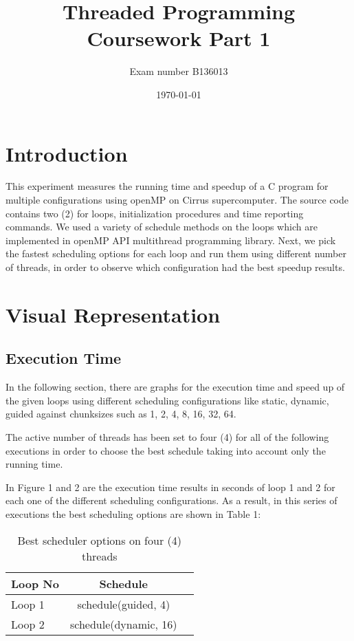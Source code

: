 \documentclass[12pt,a4paper]{article}
\newcommand{\sectionVspacing}{\vspace{15pt}}
\begin{document}
\title{Threaded Programming Coursework Part 1}
\author{Exam number B136013}
\date{\today}

\makeEPCCtitle

\thispagestyle{empty}

\newpage

\tableofcontents

\newpage



\section{Introduction}
This experiment measures the running time and speedup of a C program for multiple configurations using openMP on Cirrus supercomputer. The source code contains two (2) for loops, initialization procedures and time reporting commands. We used a variety of schedule methods on the loops which are implemented in openMP API multithread programming library. Next, we pick the fastest scheduling options for each loop and run them using different number of threads, in order to observe which configuration had the best speedup results.

\sectionVspacing

\section{Visual Representation}
	
\subsection{Execution Time}
In the following section, there are graphs for the execution time and speed up of the given loops using different scheduling configurations like static, dynamic, guided against chunksizes such as 1, 2, 4, 8, 16, 32, 64.

The active number of threads has been set to four (4) for all of the following executions in order to choose the best schedule taking into account only the running time.

In Figure 1 and 2 are the execution time results in seconds of loop 1 and 2 for each one of the different scheduling configurations. As a result, in this series of executions the best scheduling options are shown in Table 1:

\begin{table}[h]
	\begin{center}
		\begin{tabular}{||l|c|l||}
			\hline
			{\bf Loop No} & {\bf Schedule}\\
			\hline
			Loop 1         &  schedule(guided, 4)\\
			Loop 2         &  schedule(dynamic, 16)\\
			\hline
		\end{tabular}
	\end{center}
	\caption{Best scheduler options on four (4) threads}
	\label{simple_table}
\end{table}
\end{document}
